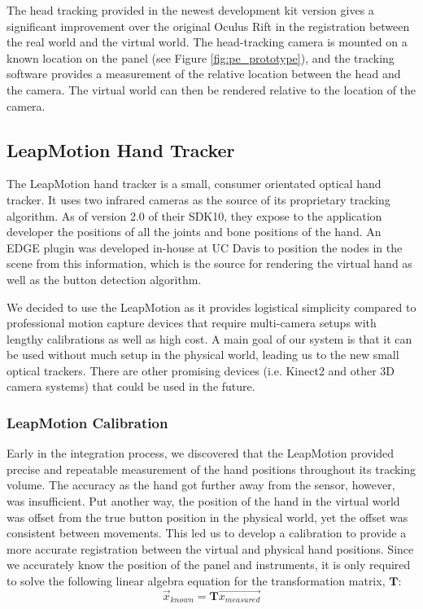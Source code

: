 The head tracking provided in the newest development kit version gives a significant improvement over the original Oculus Rift in the registration between the real world and the virtual world.
The head-tracking camera is mounted on a known location on the panel (see Figure \ref{fig:pe_prototype}), and the tracking software provides a measurement of the relative location between the head and the camera.
The virtual world can then be rendered relative to the location of the camera.


\subsection{LeapMotion Hand Tracker}

The LeapMotion hand tracker is a small, consumer orientated optical hand tracker.
It uses two infrared cameras as the source of its proprietary tracking algorithm.
As of version 2.0 of their SDK10, they expose to the application developer the positions of all the joints and bone positions of the hand.
An EDGE plugin was developed in-house at UC Davis to position the nodes in the scene from this information, which is the source for rendering the virtual hand as well as the button detection algorithm.

We decided to use the LeapMotion as it provides logistical simplicity compared to professional motion capture devices that require multi-camera setups with lengthy calibrations as well as high cost.
A main goal of our system is that it can be used without much setup in the physical world, leading us to the new small optical trackers.
There are other promising devices (i.e. Kinect2 and other 3D camera systems) that could be used in the future.

\subsubsection{LeapMotion Calibration}

Early in the integration process, we discovered that the LeapMotion provided precise and repeatable measurement of the hand positions throughout its tracking volume.
The accuracy as the hand got further away from the sensor, however, was insufficient.
Put another way, the position of the hand in the virtual world was offset from the true button position in the physical world, yet the offset was consistent between movements.
This led us to develop a calibration to provide a more accurate registration between the virtual and physical hand positions.
Since we accurately know the position of the panel and instruments, it is only required to solve the following linear algebra equation for the transformation matrix, $\mathbf{T}$:
\begin{equation}
    \vec{x}_{known} = \mathbf{T}\vec{x_{measured}}
    \label{eq:pe_Tvec}
\end{equation}

